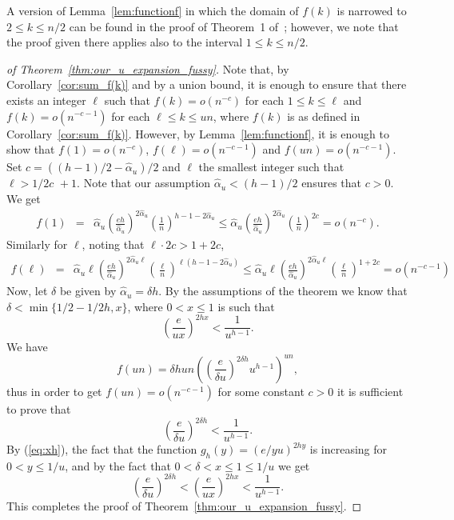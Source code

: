 \documentclass[runningheads, envcountsame, smallextended]{llncs}
\numberwithin{theorem}{section}
\numberwithin{definition}{section}
\numberwithin{lemma}{section}
\numberwithin{corollary}{section}
\numberwithin{proposition}{section}
\numberwithin{conjecture}{section}
\numberwithin{remark}{section}
\numberwithin{equation}{section}
\begin{document}
A version of Lemma~\ref{lem:functionf} in which the domain of $f(k)$ is narrowed to $2 \leq k \leq n/2$ can be found in the proof of Theorem~1 of~\cite{mihail2006journal}; however, we note that the proof given there applies also to the interval $1\leq k \leq n/2$. 
%
\begin{proof}[of Theorem~\ref{thm:our_u_expansion_fussy}]
	Note that, by Corollary~\ref{cor:sum_f(k)} and by a union bound, it is enough to ensure that there exists an integer $\ell$ such that  $f(k)=o(n^{-c})$ for each $1 \leq k \leq \ell$ and $f(k)=o(n^{-c-1})$ for each $\ell \leq k \leq un$, where $f(k)$ is as defined in Corollary~\ref{cor:sum_f(k)}. However, by Lemma~\ref{lem:functionf}, it is enough to show that $f(1) = o(n^{-c})$, $f(\ell) = o(n^{-c-1})$ and $f(un) = o(n^{-c-1})$. Set $c=((h-1)/2-\hat\alpha_u)/2$ and $\ell$ the smallest integer such that $\ell>  1/2c \,\,+ 1$. Note that our assumption $\hat\alpha_u < (h-1)/2$ ensures that $c>0$.
    We get
	\begin{eqnarray*}
	f(1) 
    & = & \hat\alpha_u \left(\frac{eh}{\hat\alpha_u}\right)^{2\hat\alpha_u} \left( \frac{1}{n}\right)^{h-1-2\hat\alpha_u}  \leq \hat\alpha_u \left(\frac{eh}{\hat\alpha_u}\right)^{2\hat\alpha_u} \left( \frac{1}{n}\right)^{2c}
     =  o(n^{-c}).
	\end{eqnarray*}
    Similarly for $\ell$, noting that $\ell \cdot 2c > 1 + 2c$,
    \begin{eqnarray*}
	f(\ell) 
    & = & \hat\alpha_u  \ell \left(\frac{eh}{\hat\alpha_u}\right)^{2\hat\alpha_u \ell} \left( \frac{ \ell}{n}\right)^{\ell( h-1-2\hat\alpha_u)} 
    \leq \hat\alpha_u  \ell  \left(\frac{eh}{\hat\alpha_u}\right)^{2\hat\alpha_u\ell} \left( \frac{ \ell}{n}\right)^{1+2c}
     = o(n^{-c-1})
	\end{eqnarray*}
    Now, let $\delta$ be given by $\hat\alpha_u = \delta h$. By the assumptions of the theorem we know that $\delta < \min\{ 1/2 - 1/2h, x\}$, where $0 < x \leq 1$ is such that
	\begin{equation} \label{eq:xh}
		\left(\frac{e}{u x}\right)^{2h x} < \frac{1}{u^{h-1}}.
	\end{equation}	
	We have 
	\[ f(un) = \delta h un \left(\left(\frac{e}{\delta u}\right)^{2\delta h} u^{h-1}\right)^{un},\]
	thus in order to get $f(un)=o(n^{-c-1})$ for some constant $c>0$ it is sufficient to prove that
	\begin{equation} \label{eq:needed<1}
		\left(\frac{e}{\delta u}\right)^{2\delta h} < \frac{1}{u^{h-1}}.
	\end{equation}
	By (\ref{eq:xh}), the fact that the function  $g_h(y)=\left(e/yu\right)^{2hy}$ is increasing for $0<y\leq1/u$, and by the fact that $0<\delta < x \leq 1 \leq 1/u$ we get
	\[
	\left(\frac{e}{\delta u}\right)^{2\delta h} < \left(\frac{e}{u x}\right)^{2h x} < \frac{1}{u^{h-1}}.
	\]
This completes the proof of Theorem~\ref{thm:our_u_expansion_fussy}.
\end{proof}
\end{document}
